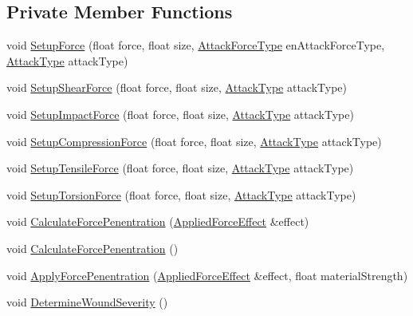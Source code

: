 \subsection*{Private Member Functions}
\begin{DoxyCompactItemize}
\item 
void \mbox{\hyperlink{class_material_aa2951eaa13d1f8137cc228ccc9b0c33c}{Setup\+Force}} (float force, float size, \mbox{\hyperlink{_enum_types_8hpp_ad893f9959c49f07fb713f13630b7ee2d}{Attack\+Force\+Type}} en\+Attack\+Force\+Type, \mbox{\hyperlink{_enum_types_8hpp_a904b2f9c8f3951116c343784c59d6afe}{Attack\+Type}} attack\+Type)
\item 
void \mbox{\hyperlink{class_material_a65d6bf35a560e97da3468e91178facdc}{Setup\+Shear\+Force}} (float force, float size, \mbox{\hyperlink{_enum_types_8hpp_a904b2f9c8f3951116c343784c59d6afe}{Attack\+Type}} attack\+Type)
\item 
void \mbox{\hyperlink{class_material_a0306582d701642b867f9c53c769ffaf7}{Setup\+Impact\+Force}} (float force, float size, \mbox{\hyperlink{_enum_types_8hpp_a904b2f9c8f3951116c343784c59d6afe}{Attack\+Type}} attack\+Type)
\item 
void \mbox{\hyperlink{class_material_a9fa7b190d0621069612e848150e780ee}{Setup\+Compression\+Force}} (float force, float size, \mbox{\hyperlink{_enum_types_8hpp_a904b2f9c8f3951116c343784c59d6afe}{Attack\+Type}} attack\+Type)
\item 
void \mbox{\hyperlink{class_material_a9d67ba42a8823f287b382ea069b7afe9}{Setup\+Tensile\+Force}} (float force, float size, \mbox{\hyperlink{_enum_types_8hpp_a904b2f9c8f3951116c343784c59d6afe}{Attack\+Type}} attack\+Type)
\item 
void \mbox{\hyperlink{class_material_a767010a40d459c05e14afc641217a21b}{Setup\+Torsion\+Force}} (float force, float size, \mbox{\hyperlink{_enum_types_8hpp_a904b2f9c8f3951116c343784c59d6afe}{Attack\+Type}} attack\+Type)
\item 
void \mbox{\hyperlink{class_material_a6b9ea544830218fa7d4e0b23c913a790}{Calculate\+Force\+Penentration}} (\mbox{\hyperlink{struct_applied_force_effect}{Applied\+Force\+Effect}} \&effect)
\item 
void \mbox{\hyperlink{class_material_a9fd060d026e50144ab7ecfd5619e2492}{Calculate\+Force\+Penentration}} ()
\item 
void \mbox{\hyperlink{class_material_af12a8f6e8bba1bffc37036530660cead}{Apply\+Force\+Penentration}} (\mbox{\hyperlink{struct_applied_force_effect}{Applied\+Force\+Effect}} \&effect, float material\+Strength)
\item 
void \mbox{\hyperlink{class_material_a15fdb8ea540098980c76d35bb2595991}{Determine\+Wound\+Severity}} ()
\end{DoxyCompactItemize}
